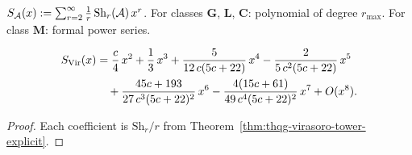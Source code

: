 \begin{definition}
$S_{\mathcal{A}}(x) := \sum_{r=2}^{\infty} \frac{1}{r}\,
\mathrm{Sh}_r(\mathcal{A})\,x^r$.
For classes $\mathbf{G}$, $\mathbf{L}$, $\mathbf{C}$:
polynomial of degree $r_{\max}$.
For class $\mathbf{M}$: formal power series.
\end{definition}

\begin{theorem}
\ClaimStatusProvedHere
\begin{align}\label{eq:thqg-virasoro-potential-explicit}
S_{\mathrm{Vir}}(x)
&= \frac{c}{4}\,x^2
+ \frac{1}{3}\,x^3
+ \frac{5}{12\,c(5c+22)}\,x^4
- \frac{2}{5\,c^2(5c+22)}\,x^5
\notag\\
&\quad + \frac{45c+193}{27\,c^3(5c+22)^2}\,x^6
- \frac{4(15c+61)}{49\,c^4(5c+22)^2}\,x^7
+ O(x^8).
\end{align}
\end{theorem}

\begin{proof}
Each coefficient is $\mathrm{Sh}_r/r$ from
Theorem~\ref{thm:thqg-virasoro-tower-explicit}.
\end{proof}

